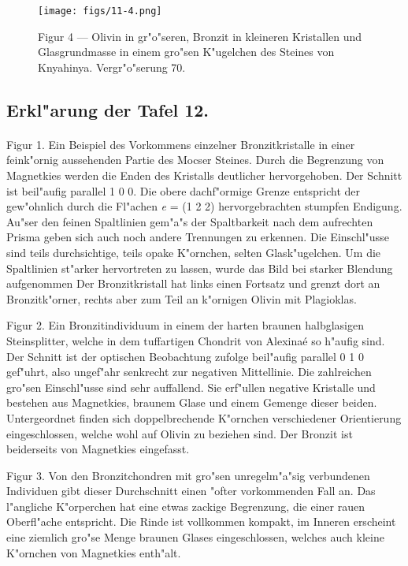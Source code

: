 \documentclass[a4paper, 11pt, oneside, polutonikogreek, german]{article}
\begin{document}
\vspace*{\fill}
\begin{figure}[H]
\centering
\texttt{[image: figs/11-4.png]}
\caption{\small Figur 4 --- Olivin in gr"o"seren, Bronzit in kleineren Kristallen und Glasgrundmasse in einem gro"sen K"ugelchen des Steines von Knyahinya. Vergr"o"serung 70.}
\end{figure}
\vspace*{\fill}
\clearpage

\subsection{Erkl"arung der Tafel 12.}
\paragraph{}
Figur 1. Ein Beispiel des Vorkommens einzelner Bronzitkristalle in einer feink"ornig aussehenden Partie des Mocser Steines. Durch die Begrenzung von Magnetkies werden die Enden des Kristalls deutlicher hervorgehoben. Der Schnitt ist beil"aufig parallel 1 0 0. Die obere dachf"ormige Grenze entspricht der gew"ohnlich durch die Fl"achen \emph{e} = (1 2 2) hervorgebrachten stumpfen Endigung. Au"ser den feinen Spaltlinien gem"a"s der Spaltbarkeit nach dem aufrechten Prisma geben sich auch noch andere Trennungen zu erkennen. Die Einschl"usse sind teils durchsichtige, teils opake K"ornchen, selten Glask"ugelchen. Um die Spaltlinien st"arker hervortreten zu lassen, wurde das Bild bei starker Blendung aufgenommen Der Bronzitkristall hat links einen Fortsatz und grenzt dort an Bronzitk"orner, rechts aber zum Teil an k"ornigen Olivin mit Plagioklas.

Figur 2. Ein Bronzitindividuum in einem der harten braunen halbglasigen Steinsplitter, welche in dem tuffartigen Chondrit von Alexinaé so h"aufig sind. Der Schnitt ist der optischen Beobachtung zufolge beil"aufig parallel 0 1 0 gef"uhrt, also ungef"ahr senkrecht zur negativen Mittellinie. Die zahlreichen gro"sen Einschl"usse sind sehr auffallend. Sie erf"ullen negative Kristalle und bestehen aus Magnetkies, braunem Glase und einem Gemenge dieser beiden. Untergeordnet finden sich doppelbrechende K"ornchen verschiedener Orientierung eingeschlossen, welche wohl auf Olivin zu beziehen sind. Der Bronzit ist beiderseits von Magnetkies eingefasst.

Figur 3. Von den Bronzitchondren mit gro"sen unregelm"a"sig verbundenen Individuen gibt dieser Durchschnitt einen "ofter vorkommenden Fall an. Das l"angliche K"orperchen hat eine etwas zackige Begrenzung, die einer rauen Oberfl"ache entspricht. Die Rinde ist vollkommen kompakt, im Inneren erscheint eine ziemlich gro"se Menge braunen Glases eingeschlossen, welches auch kleine K"ornchen von Magnetkies enth"alt.
\end{document}
